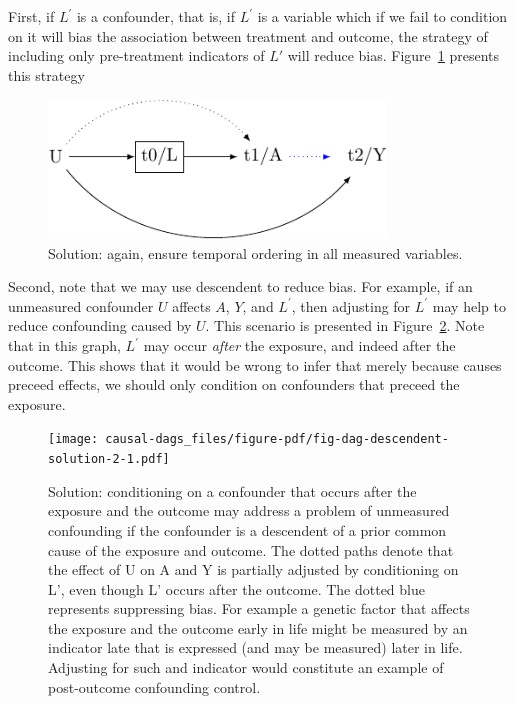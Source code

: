 \documentclass[
  singlecolumn]{report}
\begin{document}
First, if \(L^\prime\) is a confounder, that is, if \(L^\prime\) is a
variable which if we fail to condition on it will bias the association
between treatment and outcome, the strategy of including only
pre-treatment indicators of \(L\prime\) will reduce bias.
Figure~\ref{fig-dag-descendent-solution} presents this strategy

\begin{figure}

{\centering \includegraphics[width=0.8\textwidth,height=\textheight]{causal-dags_files/figure-pdf/fig-dag-descendent-solution-1.pdf}

}

\caption{\label{fig-dag-descendent-solution}Solution: again, ensure
temporal ordering in all measured variables.}

\end{figure}

Second, note that we may use descendent to reduce bias. For example, if
an unmeasured confounder \(U\) affects \(A\), \(Y\), and \(L^\prime\),
then adjusting for \(L^\prime\) may help to reduce confounding caused by
\(U\). This scenario is presented in
Figure~\ref{fig-dag-descendent-solution-2}. Note that in this graph,
\(L^\prime\) may occur \emph{after} the exposure, and indeed after the
outcome. This shows that it would be wrong to infer that merely because
causes preceed effects, we should only condition on confounders that
preceed the exposure.

\begin{figure}

{\centering \texttt{[image: causal-dags\_files/figure-pdf/fig-dag-descendent-solution-2-1.pdf]}

}

\caption{\label{fig-dag-descendent-solution-2}Solution: conditioning on
a confounder that occurs after the exposure and the outcome may address
a problem of unmeasured confounding if the confounder is a descendent of
a prior common cause of the exposure and outcome. The dotted paths
denote that the effect of U on A and Y is partially adjusted by
conditioning on L', even though L' occurs after the outcome. The dotted
blue represents suppressing bias. For example a genetic factor that
affects the exposure and the outcome early in life might be measured by
an indicator late that is expressed (and may be measured) later in life.
Adjusting for such and indicator would constitute an example of
post-outcome confounding control.}

\end{figure}
\end{document}
